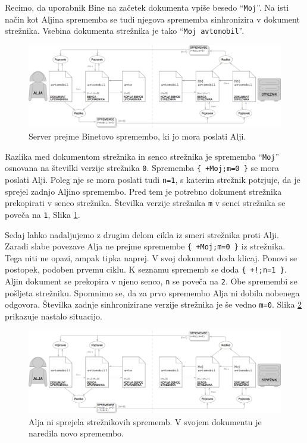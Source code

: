 \documentclass[a4paper, 12pt, twoside]{book}
\begin{document}
Recimo, da uporabnik Bine na začetek dokumenta vpiše besedo “{\tt Moj}”. Na isti način kot Aljina sprememba se tudi njegova sprememba sinhronizira v dokument strežnika. Vsebina dokumenta strežnika je tako “{\tt Moj avtomobil}”.

\begin{figure}[placement h]
\begin{center}
\includegraphics[width=16cm]{ds6.png}
\end{center}
\caption{Server prejme Binetovo spremembo, ki jo mora poslati Alji.}
\label{ds6}
\end{figure}

Razlika med dokumentom strežnika in senco strežnika je sprememba “{\tt Moj}” osnovana na številki verzije strežnika {\tt 0}. Sprememba {\tt \{ +Moj;m=0 \}} se mora poslati Alji. Poleg nje se mora poslati tudi {\tt n=1}, s katerim strežnik potrjuje, da je sprejel zadnjo Aljino spremembo. Pred tem je potrebno dokument strežnika prekopirati v senco strežnika. Številka verzije strežnika {\tt m} v senci strežnika se poveča na {\tt 1}, Slika \ref{ds6}.

Sedaj lahko nadaljujemo z drugim delom cikla iz smeri strežnika proti Alji. Zaradi slabe povezave Alja ne prejme spremembe {\tt \{ +Moj;m=0 \}} iz strežnika. Tega niti ne opazi, ampak tipka naprej. V svoj dokument doda klicaj. Ponovi se postopek, podoben prvemu ciklu. K seznamu sprememb se doda {\tt \{ +!;n=1 \}}. Aljin dokument se prekopira v njeno senco, {\tt n} se poveča na {\tt 2}. Obe spremembi se pošljeta strežniku. Spomnimo se, da za prvo spremembo Alja ni dobila nobenega odgovora. Številka zadnje sinhronizirane verzije strežnika je še vedno {\tt m=0}. Slika \ref{ds7} prikazuje nastalo situacijo.

\begin{figure}[placement h]
\begin{center}
\includegraphics[width=16cm]{ds7.png}
\end{center}
\caption{Alja ni sprejela strežnikovih sprememb. V svojem dokumentu je naredila novo spremembo.}
\label{ds7}
\end{figure}
\end{document}
